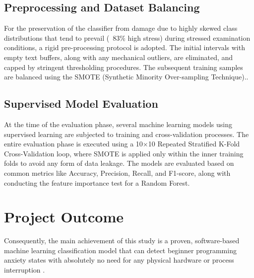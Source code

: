 \subsection{Preprocessing and Dataset Balancing}
For the preservation of the classifier from damage due to highly skewed class distributions that tend to prevail (~83\% high stress) during stressed examination conditions, a rigid pre-processing protocol is adopted. The initial intervals with empty text buffers, along with any mechanical outliers, are eliminated, and capped by stringent thresholding procedures. The subsequent training samples are balanced using the SMOTE (Synthetic Minority Over-sampling Technique)..

\subsection{Supervised Model Evaluation}
At the time of the evaluation phase, several machine learning models using supervised learning are subjected to training and cross-validation processes. The entire evaluation phase is executed using a 10$\times$10 Repeated Stratified K-Fold Cross-Validation loop, where SMOTE is applied only within the inner training folds to avoid any form of data leakage. The models are evaluated based on common metrics like Accuracy, Precision, Recall, and F1-score, along with conducting the feature importance test for a Random Forest.

\section{Project Outcome}
Consequently, the main achievement of this study is a proven, software-based machine learning classification model that can detect beginner programming anxiety states with absolutely no need for any physical hardware or process interruption \cite{mdpi5739, rahimi2024ai}. 

